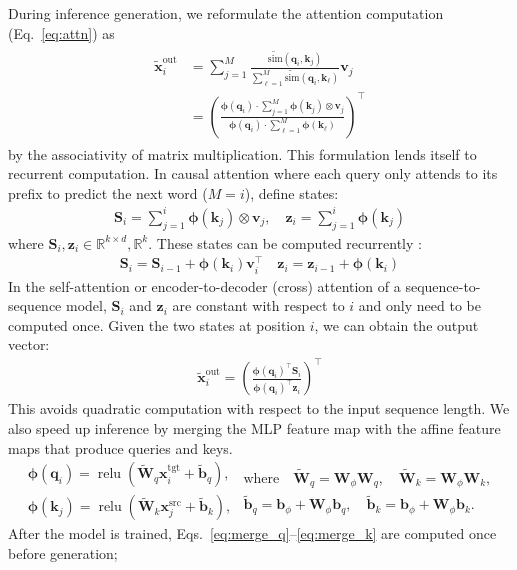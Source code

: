\documentclass[11pt]{article}
\def\similarity{\mathrm{sim}}
\def\vphi{{\boldsymbol{\phi}}}
\def\vb{{\mathbf{b}}}
\def\vk{{\mathbf{k}}}
\def\vq{{\mathbf{q}}}
\def\vv{{\mathbf{v}}}
\def\vx{{\mathbf{x}}}
\def\vz{{\mathbf{z}}}
\def\mS{{\mathbf{S}}}
\def\mW{{\mathbf{W}}}
\newcommand{\src}{{\mathrm{src}}}
\newcommand{\tgt}{{\mathrm{tgt}}}
\newcommand{\out}{{\mathrm{out}}}
\newcommand{\relu}{{\operatorname{relu}}}
\begin{document}
During inference generation, we reformulate the attention computation (Eq.~\ref{eq:attn}) as
\begin{align}
\begin{split}
\widetilde{\vx}^{\out}_i  &=  
\sum_{j=1}^M \frac{\widetilde{\similarity}\left(\vq_i, \vk_j\right)}{\sum_{\ell=1}^M \widetilde{\similarity}\left(\vq_i, \vk_{\ell}\right)} \vv_j \\
&= \left(   \frac{\vphi\left(\vq_i\right)\cdot \sum_{j=1}^M \vphi\left(\vk_j\right) \otimes \vv_j}{ \vphi\left(\vq_i\right)\cdot \sum_{\ell=1}^M \vphi\left(\vk_\ell\right)} \right)^\top
\end{split}
\end{align}
by the associativity of matrix multiplication. This formulation lends itself to recurrent computation.
In causal attention where each query only attends to its prefix to predict the next word ($M=i$), define states:
\begin{align}
\mS_i = \sum_{j=1}^i \vphi \left( \vk_j \right) \otimes  \vv_j, \quad
\vz_i   = \sum_{j=1}^i \vphi \left(\vk_j \right) \label{eq:sz}
\end{align}
where $\mS_{i}, \vz_{i} \in \mathbb{R}^{k \times d}, \mathbb{R}^{k}$.
These states can be computed recurrently \cite{katharopoulos-et-al-2020}:
\begin{align}
\mS_{i} = \mS_{i-1} + \vphi \left( \vk_i \right) \vv_i^\top  \quad \vz_{i} = \vz_{i-1} + \vphi \left(\vk_i \right) \label{eq:recurrent}
\end{align}
In the self-attention or encoder-to-decoder (cross) attention of a sequence-to-sequence model, $\mS_{i}$ and $\vz_{i}$ are constant with respect to $i$ and only need to be computed once.
Given the two states at position $i$, we can obtain the output vector: 
\begin{align}
\widetilde{\vx}_{i}^{\out} = \left(\frac{\vphi\left(\vq_i\right)^\top \mS_i}{\vphi\left(\vq_i\right)^\top \vz_i}\right)^\top \label{eq:out}
\end{align}
This avoids quadratic computation with respect to the input sequence length.
We also speed up inference by merging the MLP feature map with the affine feature maps that produce queries and keys.
\begin{subequations}
\begin{align}
\vphi \left( \vq_{i} \right) = \relu\left( \widetilde{\mW}_q \vx^\tgt_i + \widetilde{\vb}_q\right), \label{eq:phiq} \\
  \vphi \left( \vk_{j} \right) = \relu\left(\widetilde{\mW}_k \vx^\src_j + \widetilde{\vb}_k\right),\label{eq:phik}
\end{align}
\begin{align}
\text{where} \quad \widetilde{\mW}_q = \mW_\phi \mW_q, \quad \widetilde{\mW}_k = \mW_\phi \mW_k, \label{eq:merge_q}\\
  \widetilde{\vb}_q = \vb_\phi + \mW_\phi \vb_q, \quad \widetilde{\vb}_k = \vb_\phi + \mW_\phi \vb_k. \label{eq:merge_k}
\end{align}
\end{subequations}After the model is trained, Eqs.~\ref{eq:merge_q}--\ref{eq:merge_k} are computed once before generation; 
\end{document}
